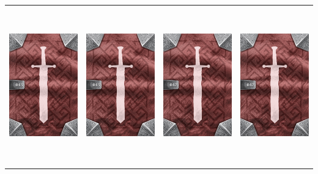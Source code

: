 \documentclass{minimal}
\begin{document}
{\begin{longtable}{llll}
\includegraphics[width=44mm,height=68mm]{./43-49/gh-043-boots-of-quickness-back.png} &
\includegraphics[width=44mm,height=68mm]{./43-49/gh-043-boots-of-quickness-back.png} &
\includegraphics[width=44mm,height=68mm]{./36-42/gh-042-ring-of-haste-back.png} &
\includegraphics[width=44mm,height=68mm]{./36-42/gh-042-ring-of-haste-back.png}\\ 

\end{longtable}}
\end{document}
